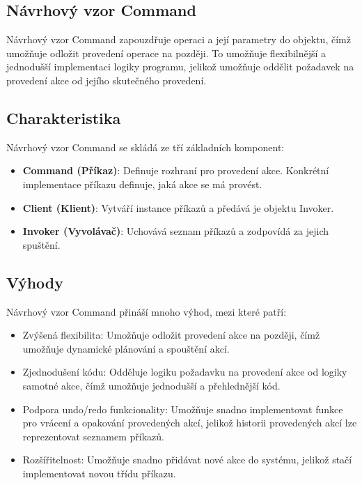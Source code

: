 \documentclass{article}
\begin{document}
    \break

    \begin{Návrhový vzor - Command}
        \section{Návrhový vzor Command}
        Návrhový vzor Command zapouzdřuje operaci a její parametry do objektu, čímž umožňuje odložit provedení operace na později.
        To umožňuje flexibilnější a jednodušší implementaci logiky programu, jelikož umožňuje oddělit požadavek na provedení akce od jejího skutečného provedení.

        \subsection{Charakteristika}

        Návrhový vzor Command se skládá ze tří základních komponent:

        \begin{itemize}
            \item \textbf{Command (Příkaz)}: Definuje rozhraní pro provedení akce.
            Konkrétní implementace příkazu definuje, jaká akce se má provést.
            \item \textbf{Client (Klient)}: Vytváří instance příkazů a předává je objektu Invoker.
            \item \textbf{Invoker (Vyvolávač)}: Uchovává seznam příkazů a zodpovídá za jejich spuštění.
        \end{itemize}

        \subsection{Výhody}

        Návrhový vzor Command přináší mnoho výhod, mezi které patří:

        \begin{itemize}
            \item Zvýšená flexibilita: Umožňuje odložit provedení akce na později, čímž umožňuje dynamické plánování a spouštění akcí.
            \item Zjednodušení kódu: Odděluje logiku požadavku na provedení akce od logiky samotné akce, čímž umožňuje jednodušší a přehlednější kód.
            \item Podpora undo/redo funkcionality: Umožňuje snadno implementovat funkce pro vrácení a opakování provedených akcí, jelikož historii provedených akcí lze reprezentovat seznamem příkazů.
            \item Rozšířitelnost: Umožňuje snadno přidávat nové akce do systému, jelikož stačí implementovat novou třídu příkazu.
        \end{itemize}


\end{Návrhový vzor - Command}
\end{document}
